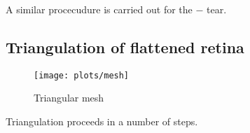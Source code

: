 \documentclass{article}
\begin{document}
A similar procecudure is carried out for the $-$ tear.


\subsection{Triangulation of flattened retina}
\label{fold-sphere:sec:triang-flatt-retina}

\begin{figure}[tp]
  \centering
  \texttt{[image: plots/mesh]}
  \caption{Triangular mesh}
  \label{fold-sphere:fig:mesh}
\end{figure}

Triangulation proceeds in a number of steps. 
\end{document}
